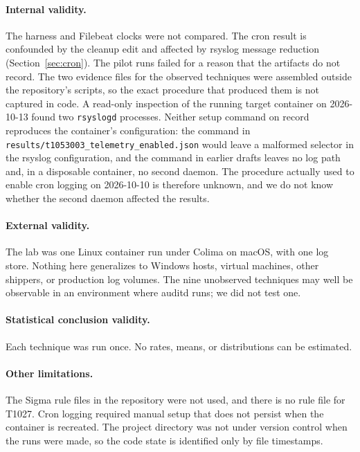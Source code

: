 \documentclass[11pt,a4paper]{article}
\begin{document}
\paragraph{Internal validity.}
The harness and Filebeat clocks were not compared. The cron result is
confounded by the cleanup edit and affected by rsyslog message reduction
(Section~\ref{sec:cron}). The pilot runs failed for a reason that the
artifacts do not record. The two evidence files for the observed techniques
were assembled outside the repository's scripts, so the exact procedure that
produced them is not captured in code. A read-only inspection of the running
target container on 2026-10-13 found two \texttt{rsyslogd} processes. Neither
setup command on record reproduces the container's configuration: the command
in \texttt{results/t1053003\_telemetry\_enabled.json} would leave a malformed
selector in the rsyslog configuration, and the command in earlier drafts leaves
no log path and, in a disposable container, no second daemon. The procedure
actually used to enable cron logging on 2026-10-10 is therefore unknown, and we
do not know whether the second daemon affected the results.

\paragraph{External validity.}
The lab was one Linux container run under Colima on macOS, with one log
store. Nothing here generalizes to Windows hosts, virtual machines, other
shippers, or production log volumes. The nine unobserved techniques may well
be observable in an environment where auditd runs; we did not test one.

\paragraph{Statistical conclusion validity.}
Each technique was run once. No rates, means, or distributions can be
estimated.

\paragraph{Other limitations.}
The Sigma rule files in the repository were not used, and there is no rule
file for T1027. Cron logging required manual setup that does not persist when
the container is recreated. The project directory was not under version
control when the runs were made, so the code state is identified only by file
timestamps.
\end{document}
